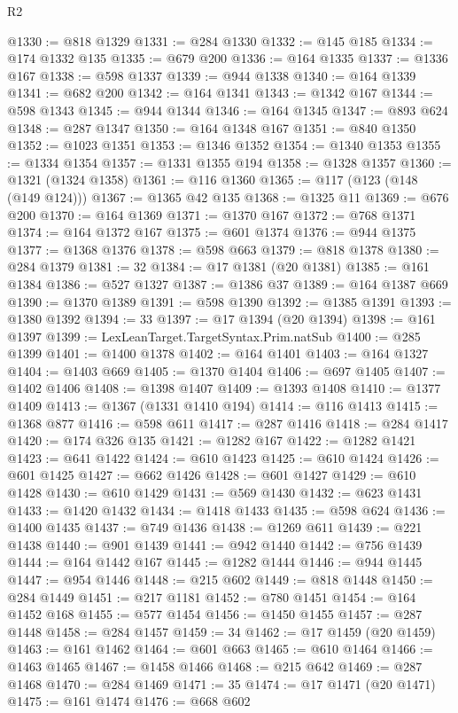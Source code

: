 \begin{lexlean}{R2}
\begin{coremodule}
@1330 := @818 @1329
@1331 := @284 @1330
@1332 := @145 @185
@1334 := @174 @1332 @135
@1335 := @679 @200
@1336 := @164 @1335
@1337 := @1336 @167
@1338 := @598 @1337
@1339 := @944 @1338
@1340 := @164 @1339
@1341 := @682 @200
@1342 := @164 @1341
@1343 := @1342 @167
@1344 := @598 @1343
@1345 := @944 @1344
@1346 := @164 @1345
@1347 := @893 @624
@1348 := @287 @1347
@1350 := @164 @1348 @167
@1351 := @840 @1350
@1352 := @1023 @1351
@1353 := @1346 @1352
@1354 := @1340 @1353
@1355 := @1334 @1354
@1357 := @1331 @1355 @194
@1358 := @1328 @1357
@1360 := @1321 (@1324 @1358)
@1361 := @116 @1360
@1365 := @117 (@123 (@148 (@149 @124)))
@1367 := @1365 @42 @135
@1368 := @1325 @11
@1369 := @676 @200
@1370 := @164 @1369
@1371 := @1370 @167
@1372 := @768 @1371
@1374 := @164 @1372 @167
@1375 := @601 @1374
@1376 := @944 @1375
@1377 := @1368 @1376
@1378 := @598 @663
@1379 := @818 @1378
@1380 := @284 @1379
@1381 := 32
@1384 := @17 @1381 (@20 @1381)
@1385 := @161 @1384
@1386 := @527 @1327
@1387 := @1386 @37
@1389 := @164 @1387 @669
@1390 := @1370 @1389
@1391 := @598 @1390
@1392 := @1385 @1391
@1393 := @1380 @1392
@1394 := 33
@1397 := @17 @1394 (@20 @1394)
@1398 := @161 @1397
@1399 := LexLeanTarget.TargetSyntax.Prim.natSub
@1400 := @285 @1399
@1401 := @1400 @1378
@1402 := @164 @1401
@1403 := @164 @1327
@1404 := @1403 @669
@1405 := @1370 @1404
@1406 := @697 @1405
@1407 := @1402 @1406
@1408 := @1398 @1407
@1409 := @1393 @1408
@1410 := @1377 @1409
@1413 := @1367 (@1331 @1410 @194)
@1414 := @116 @1413
@1415 := @1368 @877
@1416 := @598 @611
@1417 := @287 @1416
@1418 := @284 @1417
@1420 := @174 @326 @135
@1421 := @1282 @167
@1422 := @1282 @1421
@1423 := @641 @1422
@1424 := @610 @1423
@1425 := @610 @1424
@1426 := @601 @1425
@1427 := @662 @1426
@1428 := @601 @1427
@1429 := @610 @1428
@1430 := @610 @1429
@1431 := @569 @1430
@1432 := @623 @1431
@1433 := @1420 @1432
@1434 := @1418 @1433
@1435 := @598 @624
@1436 := @1400 @1435
@1437 := @749 @1436
@1438 := @1269 @611
@1439 := @221 @1438
@1440 := @901 @1439
@1441 := @942 @1440
@1442 := @756 @1439
@1444 := @164 @1442 @167
@1445 := @1282 @1444
@1446 := @944 @1445
@1447 := @954 @1446
@1448 := @215 @602
@1449 := @818 @1448
@1450 := @284 @1449
@1451 := @217 @1181
@1452 := @780 @1451
@1454 := @164 @1452 @168
@1455 := @577 @1454
@1456 := @1450 @1455
@1457 := @287 @1448
@1458 := @284 @1457
@1459 := 34
@1462 := @17 @1459 (@20 @1459)
@1463 := @161 @1462
@1464 := @601 @663
@1465 := @610 @1464
@1466 := @1463 @1465
@1467 := @1458 @1466
@1468 := @215 @642
@1469 := @287 @1468
@1470 := @284 @1469
@1471 := 35
@1474 := @17 @1471 (@20 @1471)
@1475 := @161 @1474
@1476 := @668 @602

\end{coremodule}
\end{lexlean}
